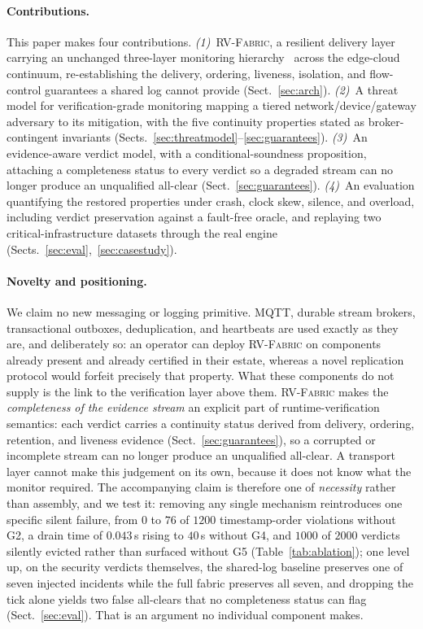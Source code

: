 \documentclass[runningheads]{llncs}
\newcommand{\sys}{\textsc{RV-Fabric}\xspace}
\begin{document}
\paragraph{Contributions.} This paper makes four contributions.
\emph{(1)}~\sys, a resilient delivery layer carrying an unchanged three-layer monitoring
hierarchy~\cite{ares2026,csr2026} across the edge-cloud continuum, re-establishing the
delivery, ordering, liveness, isolation, and flow-control guarantees a shared log cannot
provide (Sect.~\ref{sec:arch}). \emph{(2)}~A threat model for verification-grade
monitoring mapping a tiered network/device/gateway adversary to its mitigation, with the
five continuity properties stated as broker-contingent invariants
(Sects.~\ref{sec:threatmodel}--\ref{sec:guarantees}). \emph{(3)}~An evidence-aware verdict
model, with a conditional-soundness proposition, attaching a completeness status to every
verdict so a degraded stream can no longer produce an unqualified all-clear
(Sect.~\ref{sec:guarantees}). \emph{(4)}~An evaluation quantifying the restored properties
under crash, clock skew, silence, and overload, including verdict preservation against a
fault-free oracle, and replaying two critical-infrastructure datasets through the real
engine (Sects.~\ref{sec:eval},~\ref{sec:casestudy}).

\paragraph{Novelty and positioning.} We claim no new messaging or logging primitive.
MQTT, durable stream brokers, transactional outboxes, deduplication, and heartbeats are
used exactly as they are, and deliberately so: an operator can deploy \sys on components
already present and already certified in their estate, whereas a novel replication
protocol would forfeit precisely that property. What these components do not supply is
the link to the verification layer above them. \sys makes the \emph{completeness of the
evidence stream} an explicit part of runtime-verification semantics: each verdict carries
a continuity status derived from delivery, ordering, retention, and liveness evidence
(Sect.~\ref{sec:guarantees}), so a corrupted or incomplete stream can no longer produce
an unqualified all-clear. A transport layer cannot make this judgement on its own,
because it does not know what the monitor required. The accompanying claim is therefore
one of \emph{necessity} rather than assembly, and we test it: removing any single
mechanism reintroduces one specific silent failure, from $0$ to $76$ of $1200$
timestamp-order violations without G2, a drain time of $0.043$\,s rising to $40$\,s
without G4, and $1000$ of $2000$ verdicts silently evicted rather than surfaced without
G5 (Table~\ref{tab:ablation}); one level up, on the security verdicts themselves, the
shared-log baseline preserves one of seven injected incidents while the full fabric
preserves all seven, and dropping the tick alone yields two false all-clears that no
completeness status can flag (Sect.~\ref{sec:eval}). That is an argument no individual
component makes.
\end{document}
